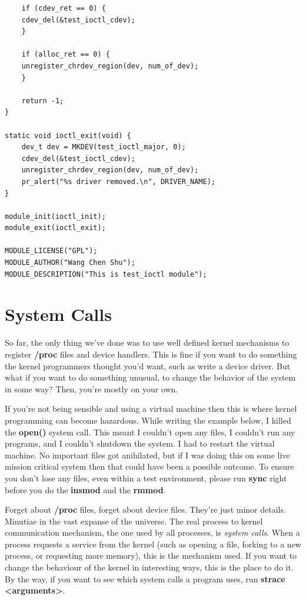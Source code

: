 \documentclass[11pt]{article}
\begin{document}
\begin{verbatim}
    if (cdev_ret == 0) {
	cdev_del(&test_ioctl_cdev);
    }

    if (alloc_ret == 0) {
	unregister_chrdev_region(dev, num_of_dev);
    }

    return -1;
}

static void ioctl_exit(void) {
    dev_t dev = MKDEV(test_ioctl_major, 0);
    cdev_del(&test_ioctl_cdev);
    unregister_chrdev_region(dev, num_of_dev);
    pr_alert("%s driver removed.\n", DRIVER_NAME);
}

module_init(ioctl_init);
module_exit(ioctl_exit);

MODULE_LICENSE("GPL");
MODULE_AUTHOR("Wang Chen Shu");
MODULE_DESCRIPTION("This is test_ioctl module");
\end{verbatim}

\section{System Calls}
\label{sec:orga925e22}
So far, the only thing we've done was to use well defined kernel mechanisms to register \textbf{/proc} files and device handlers. This is fine if you want to do something the kernel programmers thought you'd want, such as write a device driver. But what if you want to do something unusual, to change the behavior of the system in some way? Then, you're mostly on your own.

If you're not being sensible and using a virtual machine then this is where kernel programming can become hazardous. While writing the example below, I killed the \textbf{open()} system call. This meant I couldn't open any files, I couldn't run any programs, and I couldn't shutdown the system. I had to restart the virtual machine. No important files got anihilated, but if I was doing this on some live mission critical system then that could have been a possible outcome. To ensure you don't lose any files, even within a test environment, please run \textbf{sync} right before you do the \textbf{insmod} and the \textbf{rmmod}.

Forget about \textbf{/proc} files, forget about device files. They're just minor details. Minutiae in the vast expanse of the universe. The real process to kernel communication mechanism, the one used by all processes, is \emph{system calls}. When a process requests a service from the kernel (such as opening a file, forking to a new process, or requesting more memory), this is the mechanism used. If you want to change the behaviour of the kernel in interesting ways, this is the place to do it. By the way, if you want to see which system calls a program uses, run \textbf{strace <arguments>}.
\end{document}

